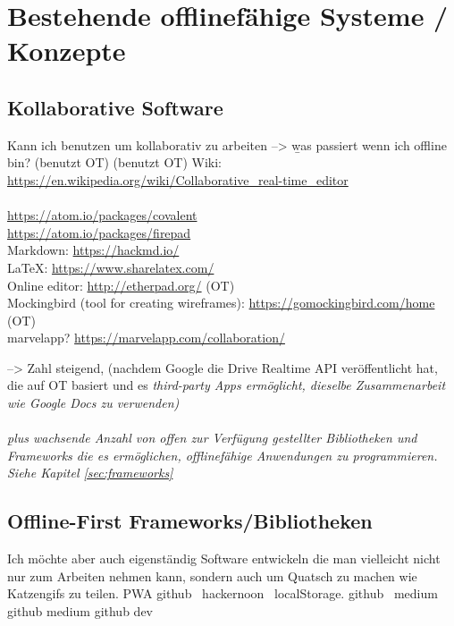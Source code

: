 \chapter{\label{chap:state}Bestehende offlinefähige Systeme / Konzepte}
%
%
\section{Kollaborative Software}
  Kann ich benutzen um kollaborativ zu arbeiten --> \b{was passiert wenn ich offline bin?}
  (benutzt OT)
  (benutzt OT)
  Wiki: \url{https://en.wikipedia.org/wiki/Collaborative_real-time_editor}\\\\
  \url{https://atom.io/packages/covalent}\\
  \url{https://atom.io/packages/firepad}\\
  Markdown: \url{https://hackmd.io/}\\
  LaTeX: \url{https://www.sharelatex.com/}\\
  Online editor: \url{http://etherpad.org/} (OT)\\
  Mockingbird (tool for creating wireframes): \url{https://gomockingbird.com/home} (OT)\\
  marvelapp? \url{https://marvelapp.com/collaboration/}

  --> Zahl steigend, (nachdem Google die Drive Realtime API veröffentlicht hat, die auf \gls{OT} basiert und es \it{third-party Apps} ermöglicht, dieselbe Zusammenarbeit wie Google Docs zu verwenden)\\\\
  \b{plus} wachsende Anzahl von offen zur Verfügung gestellter Bibliotheken und Frameworks die es ermöglichen, offlinefähige Anwendungen zu programmieren. Siehe Kapitel \ref{sec:frameworks}
%
%
\section{\label{sec:frameworks}Offline-First Frameworks/Bibliotheken}
  Ich möchte aber auch eigenständig Software entwickeln die man vielleicht nicht nur zum Arbeiten nehmen kann, sondern auch um Quatsch zu machen wie Katzengifs zu teilen.
  \Gls{PWA}
  \cite{realm}
  github~\cite{redux-offline-gh}
  hackernoon~\cite{redux-offline}
  localStorage. github~\cite{redux-persist-gh} medium~\cite{redux-persist}
  github \cite{rn-offline-gh} medium\cite{rn-offline-medium}
  github\cite{webpack-gh}
  dev\cite{webpack-dev}
  \cite{hoodie}